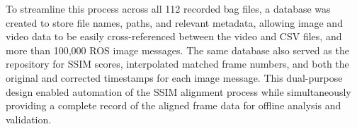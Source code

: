 \documentclass[../main.tex]{subfiles}
\begin{document}
To streamline this process across all 112 recorded bag files, a database was created to store file names, paths, and relevant metadata, allowing image and video data to be easily cross-referenced between the video and CSV files, and more than 100,000 ROS image messages. 
The same database also served as the repository for SSIM scores, interpolated matched frame numbers, and both the original and corrected timestamps for each image message. 
This dual-purpose design enabled automation of the SSIM alignment process while simultaneously providing a complete record of the aligned frame data for offline analysis and validation.

\end{document}
